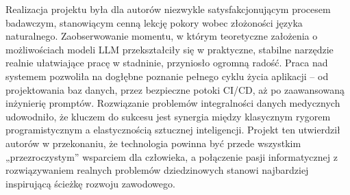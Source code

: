 Realizacja projektu była dla autorów niezwykle satysfakcjonującym procesem badawczym, stanowiącym cenną lekcję pokory wobec złożoności języka naturalnego. Zaobserwowanie momentu, w którym teoretyczne założenia o możliwościach modeli LLM przekształciły się w praktyczne, stabilne narzędzie realnie ułatwiające pracę w stadninie, przyniosło ogromną radość. Praca nad systemem pozwoliła na dogłębne poznanie pełnego cyklu życia aplikacji -- od projektowania baz danych, przez bezpieczne potoki CI/CD, aż po zaawansowaną inżynierię promptów. Rozwiązanie problemów integralności danych medycznych udowodniło, że kluczem do sukcesu jest synergia między klasycznym rygorem programistycznym a elastycznością sztucznej inteligencji. Projekt ten utwierdził autorów w przekonaniu, że technologia powinna być przede wszystkim „przezroczystym” wsparciem dla człowieka, a połączenie pasji informatycznej z rozwiązywaniem realnych problemów dziedzinowych stanowi najbardziej inspirującą ścieżkę rozwoju zawodowego. %
